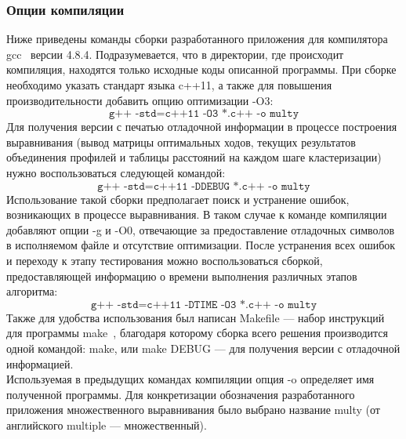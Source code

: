 \subsubsection[Опции компиляции]{\large Опции компиляции}
\hspace{\parindent} Ниже приведены команды сборки разработанного приложения для компилятора gcc~\cite{GCC} версии 4.8.4. Подразумевается, что в директории, где происходит компиляция, находятся только исходные коды описанной программы. При сборке необходимо указать стандарт языка c++11, а также для повышения производительности добавить опцию оптимизации -O3:
\begin{equation*}
\texttt{g++ -std=c++11 -O3 *.c++ -o multy}
\end{equation*}
\indent Для получения версии с печатью отладочной информации в процессе построения выравнивания (вывод матрицы оптимальных ходов, текущих результатов объединения профилей и таблицы расстояний на каждом шаге кластеризации) нужно воспользоваться следующей командой:
\begin{equation*}
\texttt{g++ -std=c++11 -DDEBUG *.c++ -o multy}
\end{equation*}
\indent Использование такой сборки предполагает поиск и устранение ошибок, возникающих в процессе выравнивания. В таком случае к команде компиляции добавляют опции -g и -O0, отвечающие за предоставление отладочных символов в исполняемом файле и отсутствие оптимизации. После устранения всех ошибок и переходу к этапу тестирования можно воспользоваться сборкой, предоставляющей информацию о времени выполнения различных этапов алгоритма:
\begin{equation*}
\texttt{g++ -std=c++11 -DTIME -O3 *.c++ -o multy}
\end{equation*}
\indent Также для удобства использования был написан Makefile --- набор инструкций для программы make~\cite{MAKE}, благодаря которому сборка всего решения производится одной командой: make, или make DEBUG --- для получения версии с отладочной информацией.\\
\indent Используемая в предыдущих командах компиляции опция -o определяет имя полученной программы. Для конкретизации обозначения разработанного приложения множественного выравнивания было выбрано название multy (от английского multiple --- множественный).

